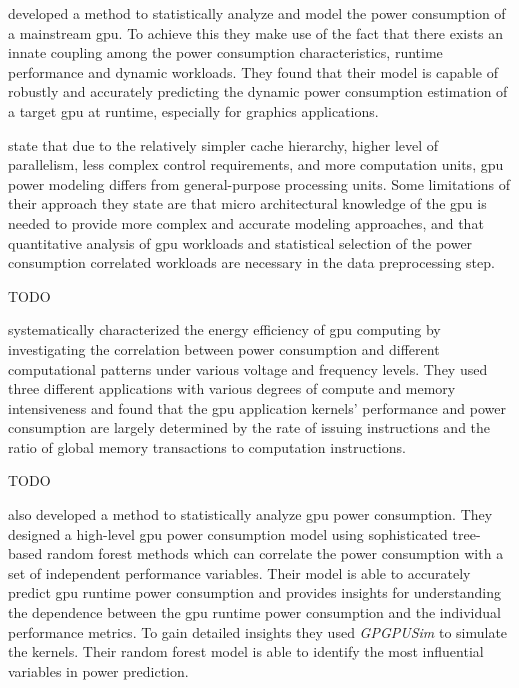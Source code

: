 			\textcite{Ma2009} developed a method to statistically analyze and model the power consumption of a mainstream \gls{gpu}.
			To achieve this they make use of the fact that there exists an innate coupling among the power consumption characteristics, runtime performance and dynamic workloads.
			They found that their model is capable of robustly and accurately predicting the dynamic power consumption estimation of a target \gls{gpu} at runtime, especially for graphics applications.
			
			\textcite{Ma2009} state that due to the relatively simpler cache hierarchy, higher level of parallelism, less complex control requirements, and more computation units, \gls{gpu} power modeling differs from general-purpose processing units.
			Some limitations of their approach they state are that micro architectural knowledge of the \gls{gpu} is needed to provide more complex and accurate modeling approaches, and that quantitative analysis of \gls{gpu} workloads and statistical selection of the power consumption correlated workloads are necessary in the data preprocessing step.

			\textcite{Hong2010} TODO

			\textcite{Jiao2010} systematically characterized the energy efficiency of \gls{gpu} computing by investigating the correlation between power consumption and different computational patterns under various voltage and frequency levels.
			They used three different applications with various degrees of compute and memory intensiveness and found that the \gls{gpu} application kernels' performance and power consumption are largely determined by the rate of issuing instructions and the ratio of global memory transactions to computation instructions.

			\textcite{Nagasaka2010} TODO

			\textcite{Chen2011} also developed a method to statistically analyze \gls{gpu} power consumption.
			They designed a high-level \gls{gpu} power consumption model using sophisticated tree-based random forest methods which can correlate the power consumption with a set of independent performance variables.
			Their model is able to accurately predict \gls{gpu} runtime power consumption and provides insights for understanding the dependence between the \gls{gpu} runtime power consumption and the individual performance metrics.
			To gain detailed insights they used \emph{GPGPUSim} \parencite{Bakhoda2009} to simulate the kernels.
			Their random forest model is able to identify the most influential variables in power prediction.

